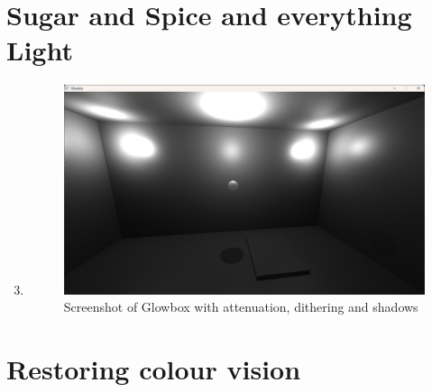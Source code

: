 \documentclass[11pt,a4paper]{report}
\begin{document}
\section{Sugar and Spice and everything Light}
\begin{enumerate}[label=(\alph*)]\setcounter{enumi}{2}
	\item \hfill
	
	\begin{figure}[h]
		\centering
		\includegraphics[width=\textwidth]{images/task2c.png}
		\caption{Screenshot of Glowbox with attenuation, dithering and shadows}
	\end{figure}
\end{enumerate}

\clearpage
\section{Restoring colour vision}
\end{document}
